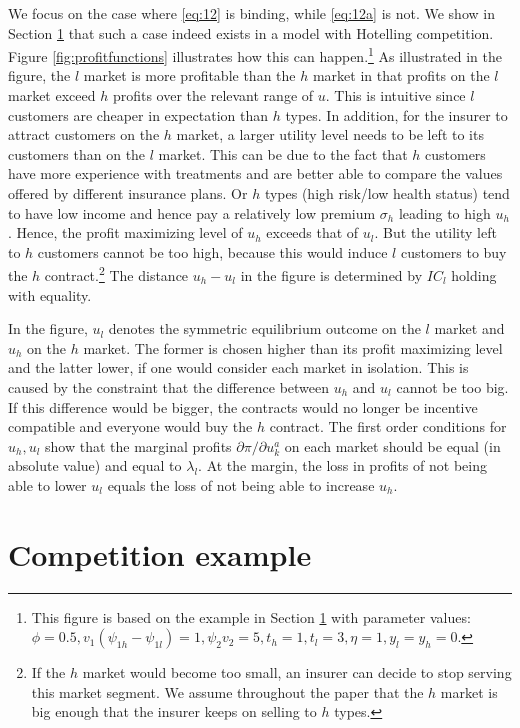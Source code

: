 \documentclass[a4paper,12pt]{article}
\begin{document}
We focus on the case where \eqref{eq:12} is binding, while \eqref{eq:12a} is not. We show in Section \ref{sec:example} that such a case indeed exists in a model with Hotelling competition. Figure \ref{fig:profitfunctions} illustrates how this can happen.\footnote{This figure is based on the example in Section \ref{sec:example} with parameter values: \(\phi=0.5,v_1(\psi_{1h}-\psi_{1l})=1,\psi_2v_2=5,t_h=1,t_l=3,\eta =1,y_l=y_h=0\).} As illustrated in the figure, the \(l\) market is more profitable than the \(h\) market in that profits on the \(l\) market exceed \(h\) profits over the relevant range of \(u\). This is intuitive since \(l\) customers are cheaper in expectation than \(h\) types. In addition, for the insurer to attract customers on the \(h\) market, a larger utility level needs to be left to its customers than on the \(l\) market. This can be due to the fact that \(h\) customers have more experience with treatments and are better able to compare the values offered by different insurance plans. Or \(h\) types (high risk/low health status) tend to have low income and hence pay a relatively low premium \(\sigma_h\) leading to high \(u_h\). Hence, the profit maximizing level of \(u_h\) exceeds that of \(u_l\). But the utility left to \(h\) customers cannot be too high, because this would induce \(l\) customers to buy the \(h\) contract.\footnote{If the \(h\) market would become too small, an insurer can decide to stop serving this market segment. We assume throughout the paper that the \(h\) market is big enough that the insurer keeps on selling to \(h\) types.} The distance \(u_h - u_l\) in the figure is determined by \(IC_l\) holding with equality.

In the figure, \(u_l\) denotes the symmetric equilibrium outcome on the \(l\) market and \(u_h\) on the \(h\) market. The former is chosen higher than its profit maximizing level and the latter lower, if one would consider each market in isolation. This is caused by the constraint that the difference between \(u_h\) and \(u_l\) cannot be too big. If this difference would be bigger, the contracts would no longer be incentive compatible and everyone would buy the \(h\) contract. The first order conditions for \(u_h,u_l\) show that the marginal profits \(\partial \pi/\partial u_k^a\) on each market should be equal (in absolute value) and equal to \(\lambda_l\). At the margin, the loss in profits of not being able to lower \(u_l\) equals the loss of not being able to increase \(u_h\).

\section{Competition example}
\label{sec:example}
\label{sec:example}
\end{document}
